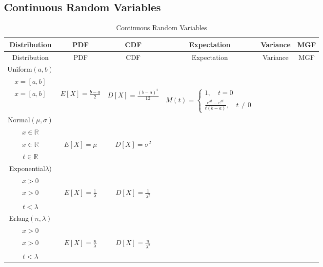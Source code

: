 \documentclass[10pt]{book}
\begin{document}
\begin{landscape}
			\section{Continuous Random Variables}
				\begin{longtable}[c]{|c|c|c|c|c|c|}
					\caption{Continuous Random Variables \label{CRV}}\\
					\hline
					Distribution & PDF & CDF & Expectation & Variance & MGF \\
					\hline
					\endfirsthead
					\hline
					Distribution & PDF & CDF & Expectation & Variance & MGF \\
					\hline
					\endhead
					Uniform$(a, b)$ & 
					\makecell{$f(x)=\frac1{b-a}$ \\ $x=[a,b]$} & 
					\makecell{$F(x)=\frac{x-a}{b-a}$ \\ $x=[a,b]$} & 
					$E[X]=\frac{b-a}{2}$ & 
					$D[X]=\frac{(b-a)^2}{12}$ & 
					$M(t)=\begin{cases}1, \quad t=0 \\ \frac{e^{bt}-e^{at}}{t(b-a)}, \quad t\ne 0\end{cases}$\\
					\hline
					Normal$(\mu, \sigma)$ &
					\makecell{$f(x)=\frac{1}{\sqrt{2\pi}\sigma}e^{-\frac{(x-\mu)^2}{2\sigma^2}}$ \\ $x\in \mathbb{R}$} &
					\makecell{$F(x)=\int_{-\infty}^{x}\frac{1}{\sqrt{2\pi}\sigma}e^{-\frac{(x-\mu)^2}{2\sigma^2}}$ \\ $x\in \mathbb{R}$} &
					$E[X]=\mu$ &
					$D[X]=\sigma^2$ &
					\makecell{$e^{\frac{t(t\sigma^2+2\mu)}{2}}$ \\ $t\in \mathbb{R}$}\\
					\hline
					Exponential$\lambda)$ &
					\makecell{$f(x)=\lambda e^{-\lambda x}$ \\ $x>0$} &
					\makecell{$F(x)=1-e^{\lambda x}$ \\ $x>0$} &
					$E[X]=\frac{1}{\lambda}$ &
					$D[X]=\frac{1}{\lambda^2}$ &
					\makecell{$\frac{1}{1-\frac{t}{\lambda}}$ \\ $t<\lambda$}\\
					\hline
					Erlang$(n, \lambda)$ &
					\makecell{$f(x)=\frac{\lambda^n x^{n-1} e^{-\lambda x}}{(n-1)!}$ \\ $x>0$} &
					\makecell{$F(x)=1-\sum_{i=0}^{n-1}\frac{\lambda^n x^n e^{-\lambda x}}{n!}$ \\ $x>0$} &
					$E[X]=\frac{n}{\lambda}$ &
					$D[X]=\frac{n}{\lambda^2}$ &
					\makecell{$\frac{1}{(1-\frac{t}{\lambda})^n}$ \\ $t<\lambda$} \\
					\hline
				\end{longtable} 
			\end{landscape}
\end{document}

